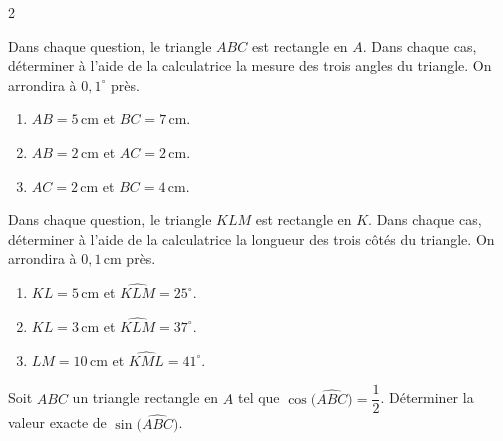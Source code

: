 \documentclass[a4paper,12pt]{article}
\begin{document}
\begin{multicols}{2}
      \begin{exercice}[title=Exercice 15 $\star$ { [Calculer, Représenter] }]{}{}
      Dans chaque question, le triangle \(ABC\) est rectangle en \(A\). Dans chaque cas, déterminer à l’aide de la calculatrice la mesure des trois angles du triangle. On arrondira à \(0{,}1^\circ\) près.
      \begin{enumerate}
        \item \(AB = 5\,\text{cm}\) et \(BC = 7\,\text{cm}\).
        \item \(AB = 2\,\text{cm}\) et \(AC = 2\,\text{cm}\).
        \item \(AC = 2\,\text{cm}\) et \(BC = 4\,\text{cm}\).
      \end{enumerate}
      \end{exercice}
      \newcolumn
      \begin{exercice}[title=Exercice 16 $\star$ { [Calculer, Représenter] }]{}{}
      Dans chaque question, le triangle \(KLM\) est rectangle en \(K\). Dans chaque cas, déterminer à l’aide de la calculatrice la longueur des trois côtés du triangle. On arrondira à \(0{,}1\,\text{cm}\) près.
      \begin{enumerate}
        \item \(KL = 5\,\text{cm}\) et \(\widehat{KLM} = 25^\circ\).
        \item \(KL = 3\,\text{cm}\) et \(\widehat{KLM} = 37^\circ\).
        \item \(LM = 10\,\text{cm}\) et \(\widehat{KML} = 41^\circ\).
      \end{enumerate}
      \end{exercice}
      
      \begin{exercice}[title=Exercice 17 $\star$ { [Calculer] }]{}{}
      Soit \(ABC\) un triangle rectangle en \(A\) tel que \(\cos\bigl(\widehat{ABC}\bigr) = \dfrac{1}{2}\). Déterminer la valeur exacte de \(\sin\bigl(\widehat{ABC}\bigr)\).
      \end{exercice}      
      

\end{multicols}
\end{document}
